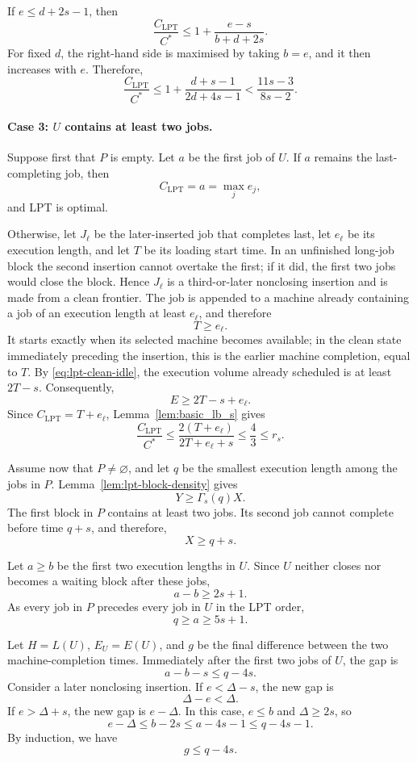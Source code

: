 \documentclass[11pt]{article}
\begin{document}
If \(e\le d+2s-1\), then
\[
\frac{C_{\mathrm{LPT}}}{C^*}
\le
1+\frac{e-s}{b+d+2s}.
\]
For fixed \(d\), the right-hand side is maximised by taking \(b=e\), and it
then increases with \(e\). Therefore, 
\[
\frac{C_{\mathrm{LPT}}}{C^*}
\le
1+\frac{d+s-1}{2d+4s-1}
<
\frac{11s-3}{8s-2}.
\]

\paragraph{Case 3: \(U\) contains at least two jobs.}

Suppose first that \(P\) is empty. Let \(a\) be the first job of \(U\). If
\(a\) remains the last-completing job, then
\[
C_{\mathrm{LPT}}=a=\max_j e_j,
\]
and LPT is optimal.

Otherwise, let \(J_\ell\) be the later-inserted job that completes last, let
\(e_\ell\) be its execution length, and let \(T\) be its loading start time. In an
unfinished long-job block the second insertion cannot overtake the first; if it did,
the first two jobs would close the block. Hence \(J_\ell\) is a third-or-later
nonclosing insertion and is made from a clean frontier. The job is appended to a machine
already containing a job of an execution length at least \(e_\ell\), and therefore
\[
T\ge e_\ell.
\]
It starts exactly when its selected machine becomes available; in the clean state
immediately preceding the insertion, this is the earlier machine completion, equal to
\(T\). By \eqref{eq:lpt-clean-idle}, the execution volume
already scheduled is at least \(2T-s\). Consequently,
\[
E\ge2T-s+e_\ell.
\]
Since \(C_{\mathrm{LPT}}=T+e_\ell\), Lemma~\ref{lem:basic_lb_s} gives
\[
\frac{C_{\mathrm{LPT}}}{C^*}
\le
\frac{2(T+e_\ell)}{2T+e_\ell+s}
\le
\frac43
\le
r_s.
\]

Assume now that \(P\ne\varnothing\), and let \(q\) be the smallest execution
length among the jobs in \(P\). Lemma~\ref{lem:lpt-block-density} gives
\[
Y\ge\Gamma_s(q)X.
\tag{A.18}
\label{eq:lpt-prefix-density}
\]
The first block in \(P\) contains at least two jobs. Its second job cannot
complete before time \(q+s\), and therefore, 
\[
X\ge q+s.
\tag{A.19}
\label{eq:lpt-prefix-length}
\]

Let \(a\ge b\) be the first two execution lengths in \(U\). Since \(U\)
neither closes nor becomes a waiting block after these jobs,
\[
a-b\ge2s+1.
\]
As every job in \(P\) precedes every job in \(U\) in the LPT order,
\[
q\ge a\ge5s+1.
\tag{A.20}
\label{eq:lpt-q-lower}
\]

Let \(H=L(U)\),  \(E_U=E(U)\), and  \(g\) be the final difference
between the two machine-completion times. Immediately after the first two jobs
of \(U\), the gap is
\[
a-b-s\le q-4s.
\]
Consider a later nonclosing insertion. If \(e<\Delta-s\), the new gap is
\[
\Delta-e<\Delta.
\]
If \(e>\Delta+s\), the new gap is \(e-\Delta\). In this case,
\(e\le b\) and \(\Delta\ge2s\), so
\[
e-\Delta
\le
b-2s
\le
a-4s-1
\le q-4s-1.
\]
By induction, we have
\[
g\le q-4s.
\tag{A.21}
\label{eq:lpt-final-gap}
\]
\end{document}
